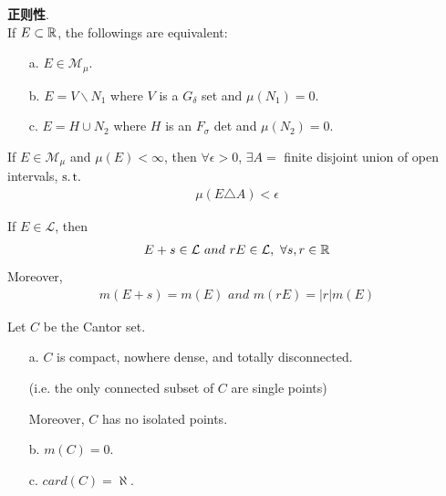 	\vspace*{6em}
	
	\begin{thm}\label{thm 2.5.4}
		\textbf{正则性}. \\
		If $E \subset \mathbb{R}$, the followings are equivalent:
		\begin{enumerate}
			\item[a.] $E \in \mathcal{M_\mu}$.
			
			\item[b.] $E = V \backslash N_1$ where $V$ is a $G_\delta$ set and $\mu(N_1) = 0$. 
			
			\item[c.] $E = H \cup N_2$ where $H$ is an $F_\sigma$ det and $\mu(N_2) = 0$.
		\end{enumerate}
	\end{thm}

	\vspace*{6em}
	
	\begin{proposition}\label{prop 2.5.2}
		If $E \in \mathcal{M}_\mu$ and $\mu(E) < \infty$, then $\forall \epsilon > 0$, $\exists A = $ finite disjoint union of open intervals, $\operatorname{s.t.}$
		\begin{align}
			\mu(E \triangle A) < \epsilon
		\end{align}
	\end{proposition}
	
	\newpage
	
	\begin{thm}\label{thm 2.5.5}
		If $E \in \mathcal{L}$, then
		\begin{align}
			E + s \in \mathcal{L} \,\, and \,\, rE \in \mathcal{L} , \,\, \forall s , r \in \mathbb{R}
		\end{align}
		Moreover, 
		\begin{align}
			m(E + s) = m(E) \,\, and \,\, m(rE) = \left| r \right| m(E)
		\end{align}
	\end{thm}
	
	\vspace*{20em}
	
	\begin{proposition}\label{prop 2.5.3}
		Let $C$ be the Cantor set.
		
		\vspace*{1em}
		\begin{enumerate}
			\item[a.] $C$ is compact, nowhere dense, and totally disconnected.
			\begin{center}
				(i.e. the only connected subset of $C$ are single points)
			\end{center}
			Moreover, $C$ has no isolated points.
			
			\vspace*{1em}
			
			\item[b.] $m(C) = 0$. 
			
			\vspace*{1em}
			
			\item[c.] $card(C) = \aleph$.
		\end{enumerate}
	\end{proposition}
	

